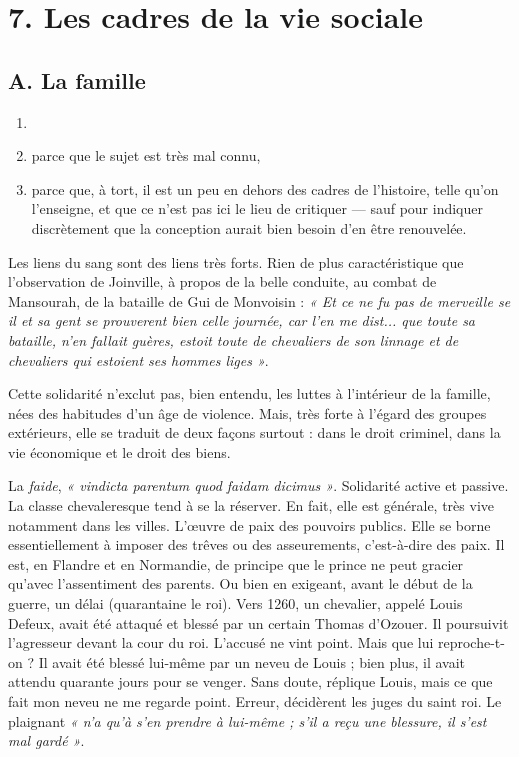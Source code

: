\documentclass[french,twoside]{book} %
\newcommand\chapteropen{} %
\newcommand\chaptercont{} %
\renewcommand\chapteropen{} %
\renewcommand\chaptercont{} %
\begin{document}
\chapteropen
\chapter[7. Les cadres de la vie sociale]{\textsc{7. }Les cadres de la vie sociale}
\label{c07}

\chaptercont
\section[A. La famille]{A. La famille}
\label{c07a}
\label{p55}
\begin{enumerate}[itemsep=0pt,]
\item[] \hspace{-1.5em}{\bfseries Il faut être bref :}
\item parce que le sujet est très mal connu,
\item parce que, à tort, il est un peu en dehors des cadres de l’histoire, telle qu’on l’enseigne, et que ce n’est pas ici le lieu de critiquer — sauf pour indiquer discrètement que la conception aurait bien besoin d’en être renouvelée.

\end{enumerate}\noindent Les liens du sang sont des liens très forts. Rien de plus caractéristique que l’observation de Joinville, à propos de la belle conduite, au combat de Mansourah, de la bataille de Gui de Monvoisin : \emph{« Et ce ne fu pas de merveille se il et sa gent se prouverent bien celle journée, car l’en me dist... que toute sa bataille, n’en fallait guères, estoit toute de chevaliers de son linnage et de chevaliers qui estoient ses hommes liges »}.\par
Cette solidarité n’exclut pas, bien entendu, les luttes à l’intérieur de la famille, nées des habitudes d’un âge de violence. Mais, très forte à l’égard des groupes extérieurs, elle se traduit de deux façons surtout : dans le droit criminel, dans la vie économique et le droit des biens.\par
La \emph{faide}, \emph{« vindicta parentum quod faidam dicimus »}. Solidarité active et passive. La classe chevaleresque tend à se la réserver. En fait, elle est générale, très vive notamment dans les villes. L’œuvre de paix des pouvoirs publics. Elle se borne essen­tiellement à imposer des trêves ou des asseurements, c’est-à-dire des paix. Il est, en Flandre et en Normandie, de principe que le prince ne peut gracier qu’avec l’assentiment des parents. Ou bien en exigeant, avant le début de la guerre, un délai (quarantaine le roi). Vers 1260, un chevalier, appelé Louis Defeux, avait été attaqué et blessé par un certain Thomas d’Ozouer. Il poursuivit l’agresseur devant la cour du roi. L’accusé ne vint point. Mais que lui reproche­-t-on ? Il avait été blessé lui-même par un neveu de Louis ; bien plus, il avait attendu quarante jours pour se venger. Sans doute, réplique Louis, mais ce que fait mon neveu ne me regarde point. Erreur, décidèrent les juges du saint roi. Le plaignant \emph{« n’a qu’à s’en prendre à lui-même ; s’il a reçu une blessure, il s’est mal gardé »}.\par
\end{document}
